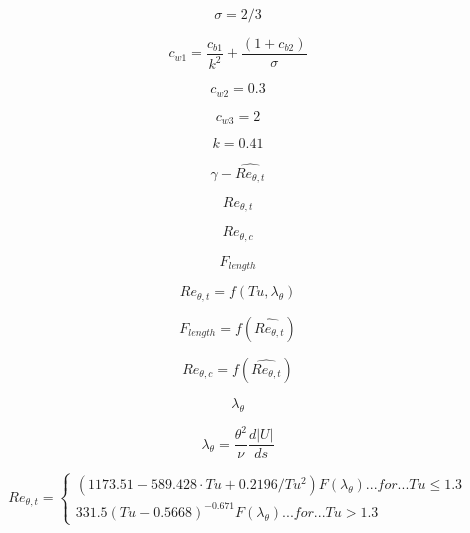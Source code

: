 \begin{equation}
\sigma=2/3
\end{equation}

\begin{equation}
c_{w1}=\frac{c_{b1}}{k^2} + \frac{(1+c_{b2})}{\sigma}
\end{equation}

\begin{equation}
c_{w2}=0.3
\end{equation}

\begin{equation}
c_{w3}=2
\end{equation}

\begin{equation}
k=0.41
\end{equation}

\begin{equation}
\gamma-\widehat{Re_{\theta,t}}
\end{equation}

\begin{equation}
Re_{\theta,t}
\end{equation}

\begin{equation}
Re_{\theta,c}
\end{equation}

\begin{equation}
F_{length}
\end{equation}

\begin{equation}
Re_{\theta,t} = f\left(Tu, \lambda_\theta\right)
\end{equation}

\begin{equation}
F_{length} = f\left( \widehat{Re_{\theta,t}} \right)
\end{equation}

\begin{equation}
Re_{\theta,c}= f\left( \widehat{Re_{\theta,t}} \right)
\end{equation}

\begin{equation}
\lambda_\theta
\end{equation}

\begin{equation}
\lambda_\theta = \frac{\theta^2}{\nu} \frac{d\left| U \right|}{d s}
\end{equation}

\begin{equation}
Re_{\theta,t} = \left\{ \begin{array}{l}
\left( 1173.51  - 589.428 \cdot Tu + 0.2196/Tu^2 \right) F\left(\lambda_\theta \right) ...{for}... Tu \leq 1.3\\
331.5\left(Tu - 0.5668\right)^{-0.671}F\left(\lambda_\theta \right) ...{for}... Tu>1.3
\end{array}
\end{equation}

